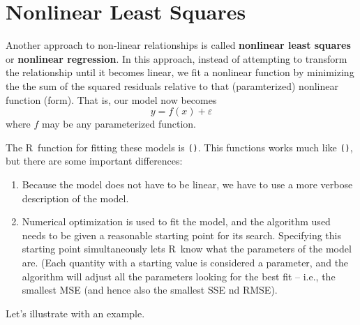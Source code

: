 \documentclass[twoside]{book}\usepackage[]{graphicx}\usepackage[]{xcolor}
\newcommand{\Rindex}[1]{\index{\texttt{#1}}}
\newcommand{\function}[1]{{\color{purple!75!blue}\texttt{\StrSubstitute{#1}{()}{}()}}\Rindex{#1}}
\def\R{{\sf R}}
\def\term#1{\textbf{#1}}
\newcounter{example}[section]
\begin{document}
\section{Nonlinear Least Squares}

Another approach to non-linear relationships is called \term{nonlinear least squares}
or \term{nonlinear regression}.  In this approach, instead of attempting to transform
the relationship until it becomes linear, we fit a nonlinear function by minimizing the 
the sum of the squared residuals relative to that (paramterized) nonlinear
function (form).  That is, our model now becomes
\[
y = f(x) + \varepsilon
\]
where $f$ may be any parameterized function.

The \R\ function for fitting these
models is \function{nls()}.  This functions works much like \function{lm()},
but there are some important differences:
	\begin{enumerate}
		\item
			Because the model does not have to be linear, we have
			to use a more verbose description of the model.
		\item
			Numerical optimization is used to fit the model, and the algorithm
			used needs to be given a reasonable starting point for its search.
			Specifying this starting point simultaneously lets \R\ know what the 
			parameters of the model are.  (Each quantity with a starting value
			is considered a parameter, and the algorithm will adjust all the parameters
			looking for the best fit -- i.e., the smallest MSE (and hence also
			the smallest SSE nd RMSE).
	\end{enumerate}

Let's illustrate with an example.
\end{document}
